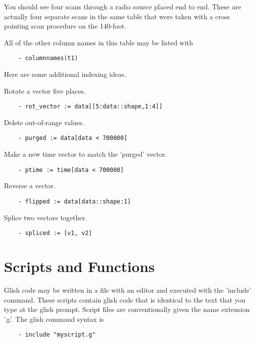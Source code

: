 You should see four scans through a radio source placed end to end.  These
are actually four separate scans in the same table that were taken with a
cross pointing scan procedure on the 140-foot.

    All of the other column names in this table may be listed with

\begin{verbatim}
	- columnnames(t1)
\end{verbatim}

    Here are some additional indexing ideas.

Rotate a vector five places.

\begin{verbatim}
	- rot_vector := data[[5:data::shape,1:4]]
\end{verbatim}

Delete out-of-range values.

\begin{verbatim}
	- purged := data[data < 700000]
\end{verbatim}

Make a new time vector to match the 'purged' vector.

\begin{verbatim}
	- ptime := time[data < 700000]
\end{verbatim}

Reverse a vector.

\begin{verbatim}
	- flipped := data[data::shape:1]
\end{verbatim}

Splice two vectors together.

\begin{verbatim}
	- spliced := [v1, v2]
\end{verbatim}

\section{Scripts and Functions}

    Glish code may be written in a file with an editor and executed with
the 'include' command.  These scripts contain glish code that is identical
to the text that you type at the glish prompt.  Script files are
conventionally given the name extension '.g'.  The glish command syntax is

\begin{verbatim}
	- include "myscript.g"
\end{verbatim}

